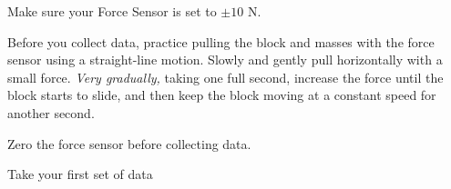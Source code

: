 \documentclass[10pt]{exam}
\begin{document}
\begin{questions}
\question
  Make sure your Force Sensor is set to $\pm 10$ N.

\question Before you collect data, practice pulling the block and masses with the force sensor using a straight-line motion. Slowly and gently pull horizontally with a small force. \emph{Very gradually,} taking one full second, increase the force until the block starts to slide, and then keep the block moving at a constant speed for another second.


\question Zero the force sensor before collecting data.

\begin{multicols}{2}
\end{multicols}

\pagebreak

\question
  Take your first set of data

\end{questions}
\end{document}
